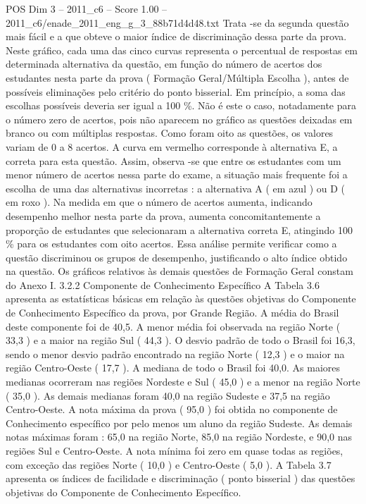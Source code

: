 \begin{textsample}{POS Dim 3 – 2011\_c6 – Score 1.00 – 2011\_c6/enade\_2011\_eng\_g\_3\_88b71d4d48.txt}
Trata -se da segunda questão mais fácil e a que obteve o maior índice de discriminação dessa parte da prova.
Neste gráfico, cada uma das cinco curvas representa o percentual de respostas em determinada alternativa da questão, em função do número de acertos dos estudantes nesta parte da prova ( Formação Geral/Múltipla Escolha ), antes de possíveis eliminações pelo critério do ponto bisserial.
Em princípio, a soma das escolhas possíveis deveria ser igual a 100 \%.
Não é este o caso, notadamente para o número zero de acertos, pois não aparecem no gráfico as questões deixadas em branco ou com múltiplas respostas.
Como foram oito as questões, os valores variam de 0 a 8 acertos.
A curva em vermelho corresponde à alternativa E, a correta para esta questão.
Assim, observa -se que entre os estudantes com um menor número de acertos nessa parte do exame, a situação mais frequente foi a escolha de uma das alternativas incorretas : a alternativa A ( em azul ) ou D ( em roxo ).
Na medida em que o número de acertos aumenta, indicando desempenho melhor nesta parte da prova, aumenta concomitantemente a proporção de estudantes que selecionaram a alternativa correta E, atingindo 100 \% para os estudantes com oito acertos.
Essa análise permite verificar como a questão discriminou os grupos de desempenho, justificando o alto índice obtido na questão.
Os gráficos relativos às demais questões de Formação Geral constam do Anexo I. 3.2.2 Componente de Conhecimento Específico A Tabela 3.6 apresenta as estatísticas básicas em relação às questões objetivas do Componente de Conhecimento Específico da prova, por Grande Região.
A média do Brasil deste componente foi de 40,5.
A menor média foi observada na região Norte ( 33,3 ) e a maior na região Sul ( 44,3 ).
O desvio padrão de todo o Brasil foi 16,3, sendo o menor desvio padrão encontrado na região Norte ( 12,3 ) e o maior na região Centro-Oeste ( 17,7 ).
A mediana de todo o Brasil foi 40,0.
As maiores medianas ocorreram nas regiões Nordeste e Sul ( 45,0 ) e a menor na região Norte ( 35,0 ).
As demais medianas foram 40,0 na região Sudeste e 37,5 na região Centro-Oeste.
A nota máxima da prova ( 95,0 ) foi obtida no componente de Conhecimento específico por pelo menos um aluno da região Sudeste.
As demais notas máximas foram : 65,0 na região Norte, 85,0 na região Nordeste, e 90,0 nas regiões Sul e Centro-Oeste.
A nota mínima foi zero em quase todas as regiões, com exceção das regiões Norte ( 10,0 ) e Centro-Oeste ( 5,0 ).
A Tabela 3.7 apresenta os índices de facilidade e discriminação ( ponto bisserial ) das questões objetivas do Componente de Conhecimento Específico.

\end{textsample}
